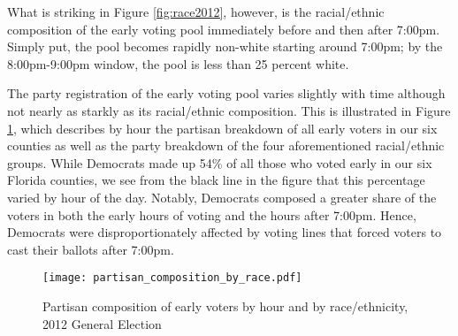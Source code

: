 \documentclass[12pt,titlepage]{article}
\begin{document}




What is striking in Figure \ref{fig:race2012}, however, is the
racial/ethnic composition of the early voting pool immediately before
and then after 7:00pm.  Simply put, the pool becomes rapidly non-white
starting around 7:00pm; by the 8:00pm-9:00pm window, the pool is less
than 25 percent white.

The party registration of the early voting pool varies slightly with
time although not nearly as starkly as its racial/ethnic composition.
This is illustrated in Figure \ref{fig:party2012}, which describes by
hour the partisan breakdown of all early voters in our six counties as
well as the party breakdown of the four aforementioned racial/ethnic
groups.  While Democrats made up 54\% of all those who voted early in
our six Florida counties, we see from the black line in the figure
that this percentage varied by hour of the day.  Notably, Democrats
composed a greater share of the voters in both the early hours of
voting and the hours after 7:00pm.  Hence, Democrats were
disproportionately affected by voting lines that forced voters to cast
their ballots after 7:00pm.

\begin{figure}[!ht]
\caption{Partisan composition of early voters by hour and by race/ethnicity, 2012
  General Election}
  \label{fig:party2012}
  \centering
    \centering\texttt{[image: partisan\_composition\_by\_race.pdf]}
\end{figure}
\end{document}
